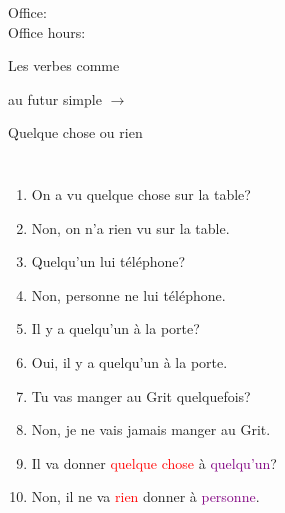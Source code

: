 \documentclass{beamer}
\subtitle[Indéfinies et négatives]{Les expressions indéfinies et négatives}
\begin{document}
  \begin{frame}
    \titlepage
    \tiny{Office: \\
          Office hours: }
  \end{frame}

  \begin{frame}{Les verbes comme }
    \begin{center}
      
    \end{center}
     au futur simple $\to$ 
  \end{frame}

  \begin{frame}{Quelque chose ou rien}
    \begin{columns}
        \begin{enumerate}
          \item On a vu \alert{quelque chose} sur la table?
          \item<2->[$\to$] Non, on n'a \alert{rien} vu sur la table.
          \item<3-> \alert{Quelqu'un} lui téléphone?
          \item<4->[$\to$] Non, \alert{personne ne} lui téléphone.
          \item<5-> Il y a \alert{quelqu'un} à la porte?
          \item<6->[$\to$] Oui, il y a \alert{quelqu'un} à la porte.
          \item<7-> Tu vas manger au Grit \alert{quelquefois}?
          \item<8->[$\to$] Non, je ne vais \alert{jamais} manger au Grit.
          \item<9-> Il va donner \textcolor{red}{quelque chose} à \textcolor{purple}{quelqu'un}?
          \item<10->[$\to$] Non, il ne va \textcolor{red}{rien} donner à \textcolor{purple}{personne}.
        \end{enumerate}
        \begin{minipage}[c][0.8\textheight]{\linewidth}
          \begin{center}
          \end{center}
        \end{minipage}
    \end{columns}
  \end{frame}
\end{document}
